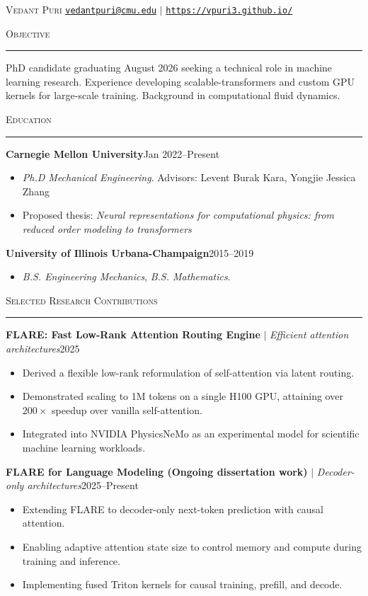 \documentclass[10pt]{article}
\newcommand{\cvsection}[1]{%
  \vspace{0.25em}%
  {\Large\textsc{#1}}\\[-0.90em]
  \rule{\linewidth}{0.4pt}
  \vspace{-0.10em}
}
\newcommand{\cvrole}[3]{\textbf{#1} $|$ \textit{#2}\hfill #3}
\begin{document}
{\Huge \textsc{Vedant Puri}}\hfill
\href{mailto:vedantpuri@cmu.edu}{\texttt{vedantpuri@cmu.edu}} $|$
\href{https://vpuri3.github.io/}{\texttt{https://vpuri3.github.io/}}

\cvsection{Objective}
PhD candidate graduating August 2026 seeking a technical role in machine learning research.
Experience developing scalable-transformers and custom GPU kernels for large-scale training.
Background in computational fluid dynamics.

\cvsection{Education}
\textbf{Carnegie Mellon University}\hfill Jan 2022--Present
\begin{itemize}[label=]
  \item \textit{Ph.D Mechanical Engineering}.
  Advisors: Levent Burak Kara, Yongjie Jessica Zhang
  \item Proposed thesis: \textit{Neural representations for computational physics: from reduced order modeling to transformers}
\end{itemize}

\textbf{University of Illinois Urbana-Champaign}\hfill 2015--2019
\begin{itemize}[label=]
  \item \textit{B.S. Engineering Mechanics}, \textit{B.S. Mathematics}.
\end{itemize}

\cvsection{Selected Research Contributions}
\cvrole{FLARE: Fast Low-Rank Attention Routing Engine}{Efficient attention architectures}{2025}
\begin{itemize}[leftmargin=1.45em,labelindent=0.45em]
  \item Derived a flexible low-rank reformulation of self-attention via latent routing.
  \item Demonstrated scaling to 1M tokens on a single H100 GPU, attaining over $200\times$ speedup over vanilla self-attention.
  \item Integrated into NVIDIA PhysicsNeMo as an experimental model for scientific machine learning workloads.
\end{itemize}

\cvrole{FLARE for Language Modeling (Ongoing dissertation work)}{Decoder-only architectures}{2025--Present}
\begin{itemize}[leftmargin=1.45em,labelindent=0.45em]
  \item Extending FLARE to decoder-only next-token prediction with causal attention.
  \item Enabling adaptive attention state size to control memory and compute during training and inference.
  \item Implementing fused Triton kernels for causal training, prefill, and decode.
\end{itemize}
\end{document}
